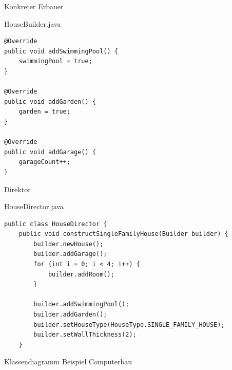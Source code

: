 \begin{frame}[fragile]{Konkreter Erbauer}
	\begin{exampleblock}{HouseBuilder.java}
 		\begin{lstlisting}
@Override
public void addSwimmingPool() {
    swimmingPool = true;
}

@Override
public void addGarden() {
    garden = true;
}

@Override
public void addGarage() {
    garageCount++;
}
 		\end{lstlisting}
 	\end{exampleblock}
\end{frame}

\begin{frame}[fragile]{Direktor}
	\begin{exampleblock}{HouseDirector.java}
 		\begin{lstlisting}
public class HouseDirector {
	public void constructSingleFamilyHouse(Builder builder) {
		builder.newHouse();
		builder.addGarage();
		for (int i = 0; i < 4; i++) {
			builder.addRoom();
		}
		
		builder.addSwimmingPool();
		builder.addGarden();
		builder.setHouseType(HouseType.SINGLE_FAMILY_HOUSE);
		builder.setWallThickness(2);
	} 		    
 		\end{lstlisting}
 	\end{exampleblock}
\end{frame}


\begin{frame}{Klassendiagramm Beispiel Computerbau}
\end{frame}

